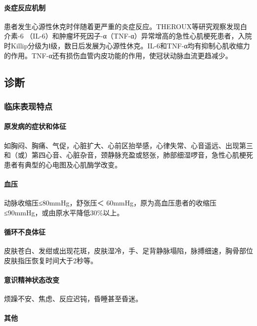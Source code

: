 \paragraph{炎症反应机制}

患者发生心源性休克时伴随着更严重的炎症反应。THEROUX等研究观察发现白介素-6
（IL-6）和肿瘤坏死因子-α（TNF-α）异常增高的急性心肌梗死患者，入院时Killip分级为Ⅰ级，数日后发展为心源性休克。IL-6和TNF-α均有抑制心肌收缩力的作用。TNF-α还有损伤血管内皮功能的作用，使冠状动脉血流更趋减少。

\subsection{诊断}

\subsubsection{临床表现特点}

\paragraph{原发病的症状和体征}

如胸闷、胸痛、气促，心脏扩大、心前区抬举感，心律失常、心音遥远、出现第三和（或）第四心音、心脏杂音，颈静脉充盈或怒张，肺部细湿啰音，急性心肌梗死患者有典型的心电图及心肌酶学改变。

\paragraph{血压}

动脉收缩压≤80mmHg，舒张压＜
60mmHg，原为高血压患者的收缩压≤90mmHg，或由原水平降低30\%以上。

\paragraph{循环不良体征}

皮肤苍白、发绀或出现花斑，皮肤湿冷，手、足背静脉塌陷，脉搏细速，胸骨部位皮肤指压恢复时间大于2秒等。

\paragraph{意识精神状态改变}

烦躁不安、焦虑、反应迟钝，昏睡甚至昏迷。

\paragraph{其他}

